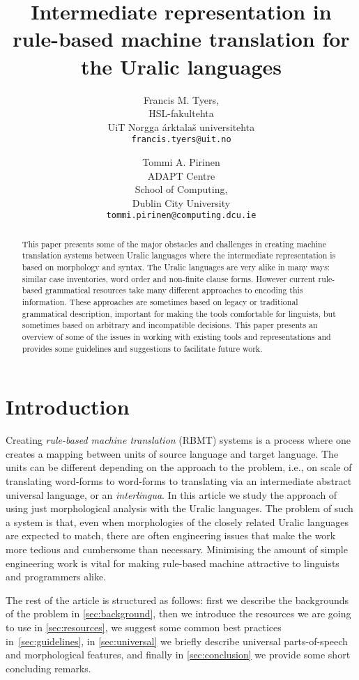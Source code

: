\documentclass[free]{flammie}
\title{Intermediate representation in rule-based machine translation for the Uralic languages\footnotepubrights{
    This work is licensed under a Creative Commons Attribution–NoDerivatives
    4.0 International Licence.  Licence details:
    \url{http://creativecommons.org/licenses/by-nd/4.0/}.
    Original publication in proceedings of second IWCLUL held in Szeged 2016}}
\author{{\small Francis M. Tyers,}\\
{\small HSL-fakultehta}\\
{\small UiT Norgga árktalaš universitehta}\\
{\small \texttt{francis.tyers@uit.no}}
\and 
{\small Tommi A. Pirinen}\\
{\small ADAPT Centre}\\{\small School of Computing,}\\
{\small Dublin City University}\\
{\small \texttt{tommi.pirinen@computing.dcu.ie}}
}
\date{}
\begin{document}
\maketitle

\begin{abstract}
This paper presents some of the major obstacles and challenges in creating machine translation systems
between Uralic languages where the intermediate representation is based on morphology and syntax. The Uralic languages are very alike in many ways: similar case inventories, word order and non-finite clause forms. However current rule-based grammatical resources take many different approaches to encoding this information. These approaches are sometimes based on legacy or traditional grammatical description, important for making the tools comfortable for linguists, but sometimes based on arbitrary and incompatible decisions. This paper presents an overview of some of the issues in working with existing tools and representations and provides some guidelines and suggestions to facilitate future work.  
\end{abstract}

\section{Introduction}


Creating \textit{rule-based machine translation} (RBMT) systems is a process where one creates a mapping between units of source language and target language.
The units can be different depending on the approach to the problem, i.e., on scale of translating word-forms to word-forms to translating via an intermediate  abstract universal language, or an \textit{interlingua}.
In this article we study the approach of using just morphological analysis with the Uralic languages.
The problem of such a system is that, even when morphologies of the closely related Uralic languages are expected to match, there are often engineering issues that make the work more tedious and cumbersome than necessary. 
Minimising the amount of simple engineering work is vital for making rule-based machine attractive to linguists and programmers alike. 

The rest of the article is structured as follows: first we describe the backgrounds of the problem in \ref{sec:background}, then we introduce the resources we are going to use in \ref{sec:resources}, we suggest some  common best practices in~\ref{sec:guidelines}, in \ref{sec:universal} we briefly describe universal parts-of-speech and morphological features, and finally in \ref{sec:conclusion} we provide some short concluding remarks.
\end{document}
